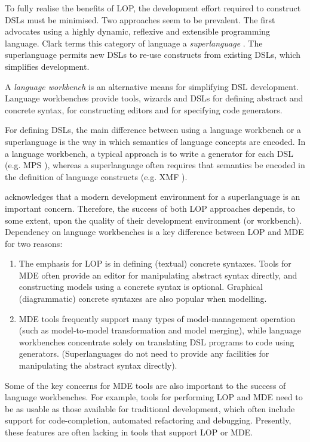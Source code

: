 To fully realise the benefits of LOP, the development effort required to construct DSLs must be minimised. Two approaches seem to be prevalent. The first advocates using a highly dynamic, reflexive and extensible programming language. Clark terms this category of language a \textit{superlanguage} \cite{clark08superlanguages}. The superlanguage permits new DSLs to re-use constructs from existing DSLs, which simplifies development.

A \textit{language workbench} \cite{fowler05language} is an alternative means for simplifying DSL development. Language workbenches provide tools, wizards and DSLs for defining abstract and concrete syntax, for constructing editors and for specifying code generators.

For defining DSLs, the main difference between using a language workbench or a superlanguage is the way in which semantics of language concepts are encoded. In a language workbench, a typical approach is to write a generator for each DSL (e.g. MPS \cite{mps}), whereas a superlanguage often requires that semantics be encoded in the definition of language constructs (e.g. XMF \cite{xmf}).

\cite{clark08superlanguages} acknowledges that a modern development environment for a superlanguage is an important concern. Therefore, the success of both LOP approaches depends, to some extent, upon the quality of their development environment (or workbench). Dependency on language workbenches is a key difference between LOP and MDE for two reasons:

\begin{enumerate}
 \item The emphasis for LOP is in defining (textual) concrete syntaxes. Tools for MDE often provide an editor for manipulating abstract syntax directly, and constructing models using a concrete syntax is optional. Graphical (diagrammatic) concrete syntaxes are also popular when modelling.
 \item MDE tools frequently support many types of model-management operation (such as model-to-model transformation and model merging), while language workbenches concentrate solely on translating DSL programs to code using generators. (Superlanguages do not need to provide any facilities for manipulating the abstract syntax directly).
\end{enumerate}

Some of the key concerns for MDE tools are also important to the success of language workbenches. For example, tools for performing LOP and MDE need to be as usable as those available for traditional development, which often include support for code-completion, automated refactoring and debugging. Presently, these features are often lacking in  tools that support LOP or MDE.

